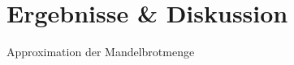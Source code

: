 \EnableTitleSlide
\section{Ergebnisse \& Diskussion}

\begin{frame}{Approximation der Mandelbrotmenge }
    \centering


\end{frame}
